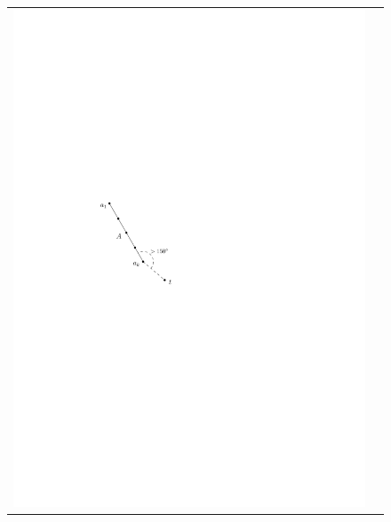 \documentclass{elsarticle}
\begin{document}
\begin{figure}
  \begin{center}
    \begin{tabular}{cc}
      \includegraphics{pics/achain} &

\end{tabular}
\end{center}
\end{figure}
\end{document}
